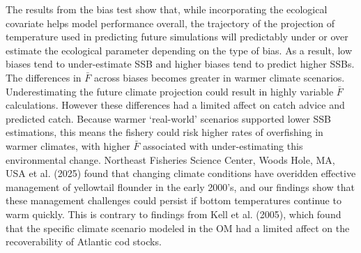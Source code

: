 \documentclass[
  12pt,
]{article}
\begin{document}
The results from the bias test show that, while incorporating the ecological covariate helps model performance overall, the trajectory of the projection of temperature used in predicting future simulations will predictably under or over estimate the ecological parameter depending on the type of bias. As a result, low biases tend to under-estimate SSB and higher biases tend to predict higher SSBs. The differences in \(\bar{F}\) across biases becomes greater in warmer climate scenarios. Underestimating the future climate projection could result in highly variable \(\bar{F}\) calculations. However these differences had a limited affect on catch advice and predicted catch. Because warmer `real-world' scenarios supported lower SSB estimations, this means the fishery could risk higher rates of overfishing in warmer climates, with higher \(\bar{F}\) associated with under-estimating this environmental change. Northeast Fisheries Science Center, Woods Hole, MA, USA et al. (2025) found that changing climate conditions have overidden effective management of yellowtail flounder in the early 2000's, and our findings show that these management challenges could persist if bottom temperatures continue to warm quickly. This is contrary to findings from Kell et al. (2005), which found that the specific climate scenario modeled in the OM had a limited affect on the recoverability of Atlantic cod stocks.
\end{document}
